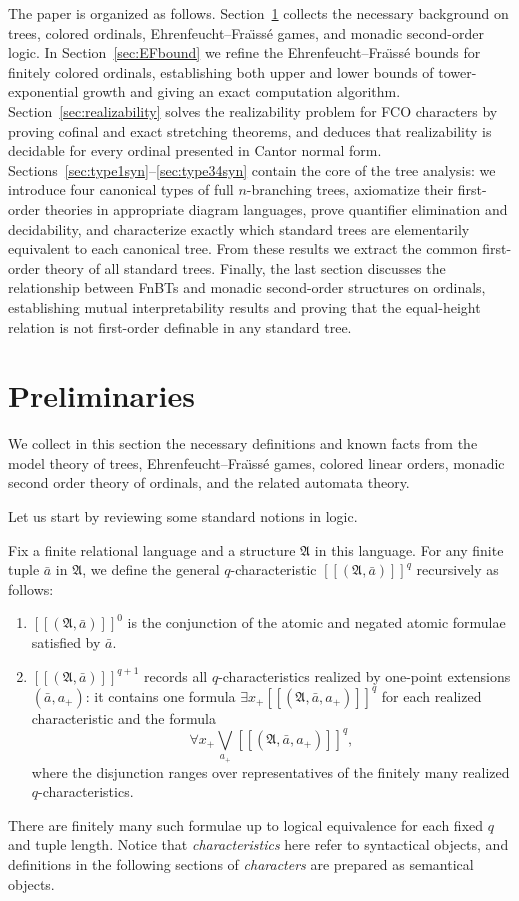 \documentclass{amsart}
\theoremstyle{definition}
\begin{document}
The paper is organized as follows. Section~\ref{sec:preliminaries} collects the necessary background on trees, colored ordinals, Ehrenfeucht–Fra\"{\i}ss\'e games, and monadic second-order logic. In Section~\ref{sec:EFbound} we refine the Ehrenfeucht–Fra\"{\i}ss\'e bounds for finitely colored ordinals, establishing both upper and lower bounds of tower-exponential growth and giving an exact computation algorithm. Section~\ref{sec:realizability} solves the realizability problem for FCO characters by proving cofinal and exact stretching theorems, and deduces that realizability is decidable for every ordinal presented in Cantor normal form. Sections~\ref{sec:type1syn}–\ref{sec:type34syn} contain the core of the tree analysis: we introduce four canonical types of full \(n\)-branching trees, axiomatize their first-order theories in appropriate diagram languages, prove quantifier elimination and decidability, and characterize exactly which standard trees are elementarily equivalent to each canonical tree. From these results we extract the common first-order theory of all standard trees. Finally, the last section discusses the relationship between FnBTs and monadic second-order structures on ordinals, establishing mutual interpretability results and proving that the equal-height relation is not first-order definable in any standard tree.

\section{Preliminaries}\label{sec:preliminaries}

We collect in this section the necessary definitions and known facts from the model theory of trees, Ehrenfeucht–Fra\"{\i}ss\'e games, colored linear orders, monadic second order theory of ordinals, and the related automata theory.

Let us start by reviewing some standard notions in logic.\label{subsec:logicprelim}

Fix a finite relational language and a structure $\mathfrak{A}$ in this language. For any finite tuple $\bar a$ in $\mathfrak A$, we define the general $q$-characteristic $[[(\mathfrak{A},\bar{a})]]^q$ recursively as follows:
\begin{enumerate}
    \item $[[(\mathfrak{A},\bar{a})]]^0$ is the conjunction of the atomic and negated atomic formulae satisfied by $\bar a$.
    \item $[[(\mathfrak{A},\bar{a})]]^{q+1}$ records all $q$-characteristics realized by one-point extensions $(\bar a,a_+)$: it contains one formula $\exists x_+[[(\mathfrak{A},\bar{a},a_+)]]^q$ for each realized characteristic and the formula
    $$\forall x_+\bigvee_{a_+}[[(\mathfrak{A},\bar{a},a_+)]]^q,$$
    where the disjunction ranges over representatives of the finitely many realized $q$-characteristics.
\end{enumerate}
There are finitely many such formulae up to logical equivalence for each fixed $q$ and tuple length. Notice that \emph{characteristics} here refer to syntactical objects, and definitions in the following sections of \emph{characters} are prepared as semantical objects.
\end{document}
